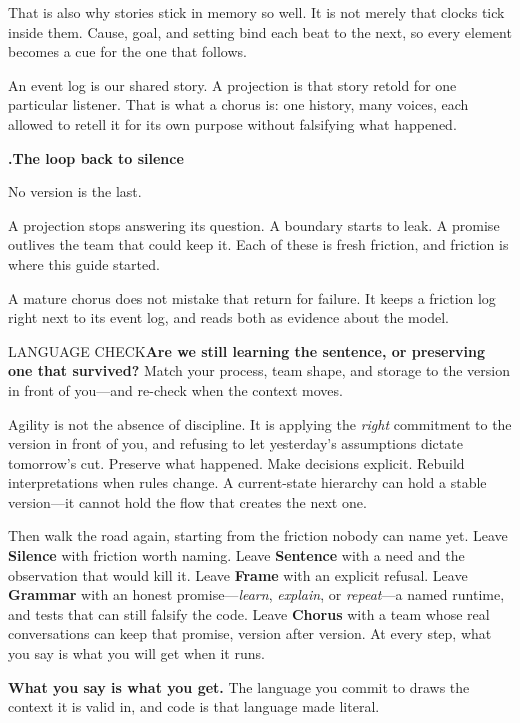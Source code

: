 \documentclass[10pt,a4paper]{article}
\newcounter{movement}
\newcounter{sub}[movement]
\renewcommand{\thesub}{\arabic{movement}.\arabic{sub}}
\newcommand{\Checkpoint}[2]{\begin{checkbox}{#1}#2\end{checkbox}}
\newcommand{\SubHead}[1]{%
  \par\Needspace{5\baselineskip}\stepcounter{sub}\vspace{2mm}%
  {\ttfamily\bfseries\footnotesize\textcolor{G2}{\thesub}\enspace\sffamily\bfseries\normalsize #1\par}%
  \vspace{0.6mm}%
}
\begin{document}
That is also why stories stick in memory so well. It is not merely that clocks tick inside them. Cause, goal, and setting bind each beat to the next, so every element becomes a cue for the one that follows.

An event log is our shared story. A projection is that story retold for one particular listener. That is what a chorus is: one history, many voices, each allowed to retell it for its own purpose without falsifying what happened.

\SubHead{The loop back to silence}

No version is the last.

A projection stops answering its question. A boundary starts to leak. A promise outlives the team that could keep it. Each of these is fresh friction, and friction is where this guide started.

A mature chorus does not mistake that return for failure. It keeps a friction log right next to its event log, and reads both as evidence about the model.

\Checkpoint{LANGUAGE CHECK}{\textbf{Are we still learning the sentence, or preserving one that survived?} Match your process, team shape, and storage to the version in front of you—and re-check when the context moves.}

\begin{devnote}
Agility is not the absence of discipline. It is applying the \emph{right} commitment to the version in front of you, and refusing to let yesterday's assumptions dictate tomorrow's cut. Preserve what happened. Make decisions explicit. Rebuild interpretations when rules change. A current-state hierarchy can hold a stable version—it cannot hold the flow that creates the next one.

Then walk the road again, starting from the friction nobody can name yet. Leave \textbf{Silence} with friction worth naming. Leave \textbf{Sentence} with a need and the observation that would kill it. Leave \textbf{Frame} with an explicit refusal. Leave \textbf{Grammar} with an honest promise—\emph{learn}, \emph{explain}, or \emph{repeat}—a named runtime, and tests that can still falsify the code. Leave \textbf{Chorus} with a team whose real conversations can keep that promise, version after version. At every step, what you say is what you will get when it runs.
\end{devnote}

\begin{claim}
\textbf{What you say is what you get.} The language you commit to draws the context it is valid in, and code is that language made literal.
\end{claim}
\end{document}
